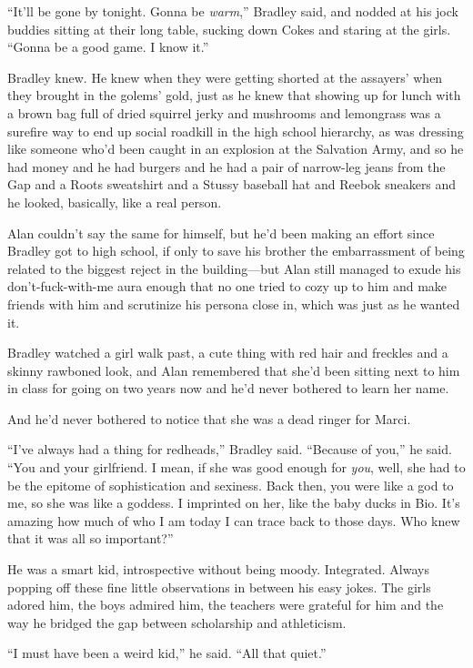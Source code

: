 ``It'll be gone by tonight.  Gonna be \textit{warm},'' Bradley said,
and nodded at his jock buddies sitting at their long table, sucking
down Cokes and staring at the girls.  ``Gonna be a good game.  I know
it.''

Bradley knew.  He knew when they were getting shorted at the assayers'
when they brought in the golems' gold, just as he knew that showing up
for lunch with a brown bag full of dried squirrel jerky and mushrooms
and lemongrass was a surefire way to end up social roadkill in the
high school hierarchy, as was dressing like someone who'd been caught
in an explosion at the Salvation Army, and so he had money and he had
burgers and he had a pair of narrow-leg jeans from the Gap and a Roots
sweatshirt and a Stussy baseball hat and Reebok sneakers and he
looked, basically, like a real person.

Alan couldn't say the same for himself, but he'd been making an effort
since Bradley got to high school, if only to save his brother the
embarrassment of being related to the biggest reject in the
building---but Alan still managed to exude his don't-fuck-with-me aura
enough that no one tried to cozy up to him and make friends with him
and scrutinize his persona close in, which was just as he wanted it.

Bradley watched a girl walk past, a cute thing with red hair and
freckles and a skinny rawboned look, and Alan remembered that she'd
been sitting next to him in class for going on two years now and he'd
never bothered to learn her name.

And he'd never bothered to notice that she was a dead ringer for
Marci.

``I've always had a thing for redheads,'' Bradley said.  ``Because of
you,'' he said.  ``You and your girlfriend.  I mean, if she was good
enough for \textit{you}, well, she had to be the epitome of
sophistication and sexiness.  Back then, you were like a god to me, so
she was like a goddess.  I imprinted on her, like the baby ducks in
Bio.  It's amazing how much of who I am today I can trace back to
those days.  Who knew that it was all so important?''

He was a smart kid, introspective without being moody.  Integrated. 
Always popping off these fine little observations in between his easy
jokes.  The girls adored him, the boys admired him, the teachers were
grateful for him and the way he bridged the gap between scholarship
and athleticism.

``I must have been a weird kid,'' he said.  ``All that quiet.''

